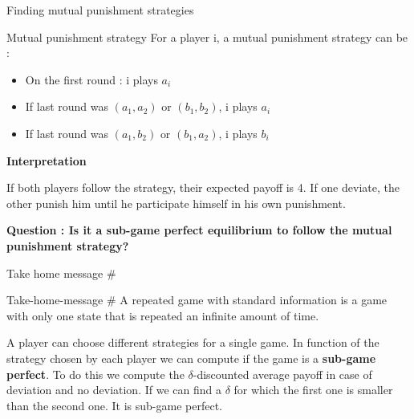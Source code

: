 \begin{frame}{Finding mutual punishment strategies}
    \begin{block}{Mutual punishment strategy}
        For a player i, a {\color{green}mutual punishment strategy} can be :
        \begin{itemize}
        	\item On the first round : i plays $a_i$ \pause
        	\item If last round was $(a_1,a_2) \text{ or } (b_1,b_2)$, i plays $a_i$ \pause
        	\item If last round was $(a_1,b_2) \text{ or } (b_1,a_2)$, i plays $b_i$
        \end{itemize}
    \end{block}
    \textbf{\color{green}Interpretation}
    
    If both players follow the strategy, their expected payoff is 4. If one deviate, the other punish him until he participate himself in his own punishment.
    
    \textbf{Question : Is it a sub-game perfect equilibrium to follow the mutual punishment strategy?}
    
\end{frame}

\begin{frame}{Take home message \#}
    \begin{block}{Take-home-message \#}
        A {\color{green}repeated game with standard information} is a game with only one state that is repeated an infinite amount of time.
        
        A player can choose different strategies for a single game. In function of the strategy chosen by each player we can compute if the game is a \textbf{sub-game perfect}. To do this we compute the $\delta$-discounted average payoff in case of deviation and no deviation. If we can find a $\delta$ for which the first one is smaller than the second one. It is sub-game perfect.
        
        
    \end{block}

\end{frame}